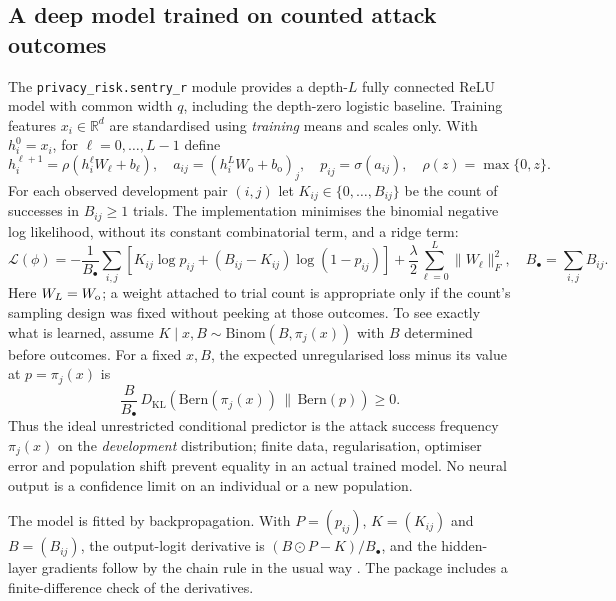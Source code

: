 \subsection{A deep model trained on counted attack outcomes}

The \texttt{privacy\_risk.sentry\_r} module provides a depth-$L$ fully connected
ReLU model with common width $q$, including the depth-zero logistic baseline.
Training features $x_i\in\mathbb R^d$ are standardised using \emph{training}
means and scales only. With $h_i^0=x_i$, for $\ell=0,\ldots,L-1$ define
\begin{equation}
 h_i^{\ell+1}=\rho(h_i^\ell W_\ell+b_\ell),\quad
 a_{ij}=\left(h_i^L W_{\mathrm o}+b_{\mathrm o}\right)_j,\quad
 p_{ij}=\sigma(a_{ij}),\quad \rho(z)=\max\{0,z\}.
 \label{eq:sentry-deep}
\end{equation}
For each observed development pair $(i,j)$ let $K_{ij}\in\{0,\ldots,B_{ij}\}$
be the count of successes in $B_{ij}\geq1$ trials. The implementation
minimises the binomial negative log likelihood, without its constant
combinatorial term, and a ridge term:
\begin{equation}
 \mathcal L(\phi)= -\frac{1}{B_\bullet}\sum_{i,j}
 \left[K_{ij}\log p_{ij}+(B_{ij}-K_{ij})\log(1-p_{ij})\right]
 +\frac{\lambda}{2}\sum_{\ell=0}^{L}\|W_\ell\|_F^2,
 \quad B_\bullet=\sum_{i,j}B_{ij}.
 \label{eq:sentry-count-loss}
\end{equation}
Here $W_L=W_{\rm o}$; a weight attached to trial count is appropriate only if
the count's sampling design was fixed without peeking at those outcomes. To
see exactly what is learned, assume $K\mid x,B\sim\mathrm{Binom}(B,\pi_j(x))$
with $B$ determined before outcomes. For a fixed $x,B$, the expected
unregularised loss minus its value at $p=\pi_j(x)$ is
\begin{equation}
 \frac{B}{B_\bullet}\,D_{\mathrm{KL}}
 \left(\mathrm{Bern}(\pi_j(x))\,\|\,\mathrm{Bern}(p)\right)\geq0.
 \label{eq:sentry-proper}
\end{equation}
Thus the ideal unrestricted conditional predictor is the attack success
frequency $\pi_j(x)$ on the \emph{development} distribution; finite data,
regularisation, optimiser error and population shift prevent equality in an
actual trained model. No neural output is a confidence limit on an individual
or a new population.

The model is fitted by backpropagation. With $P=(p_{ij})$, $K=(K_{ij})$ and
$B=(B_{ij})$, the output-logit derivative is $(B\odot P-K)/B_\bullet$, and the
hidden-layer gradients follow by the chain rule in the usual way
\citep[ch.~6]{goodfellow2016}. The package includes a finite-difference check of
the derivatives.

